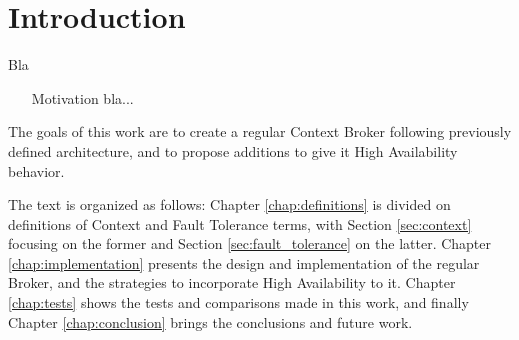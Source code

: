 \chapter{Introduction}
Bla 

\begin{itemize}
\item[Motivation]bla...

\end{itemize}

The goals of this work are to create a regular Context Broker following previously defined architecture, and to propose additions to give it High Availability behavior.

The text is organized as follows: Chapter \ref{chap:definitions} is divided on definitions of Context and Fault Tolerance terms, with Section \ref{sec:context} focusing on the former and Section \ref{sec:fault_tolerance} on the latter. Chapter \ref{chap:implementation} presents the design and implementation of the regular Broker, and the strategies to incorporate High Availability to it. Chapter \ref{chap:tests} shows the tests and comparisons made in this work, and finally Chapter \ref{chap:conclusion} brings the conclusions and future work.